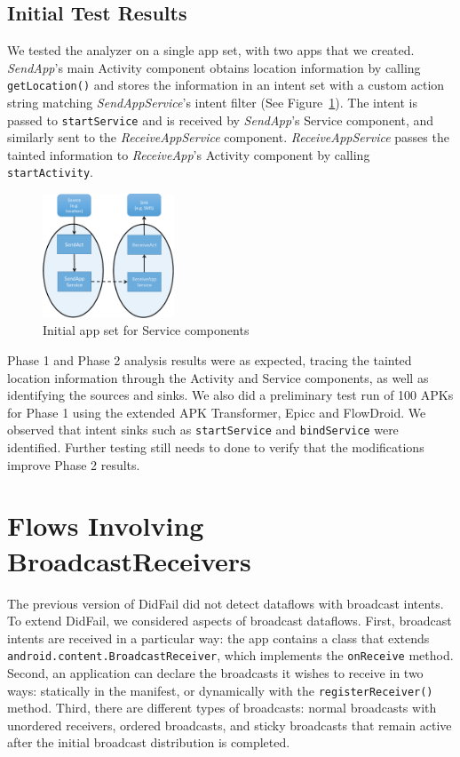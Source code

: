 \section{Initial Test Results}
We tested the analyzer on a single app set, with two apps that we created. \emph{SendApp}'s main Activity component obtains location information by calling \texttt{getLocation()} and stores the information in an intent set with a custom action string matching \emph{SendAppService}'s intent filter (See Figure~\ref{fig:servicetest1}). The intent is passed to \texttt{startService} and is received by \emph{SendApp}'s Service component, and similarly sent to the \emph{ReceiveAppService} component. \emph{ReceiveAppService} passes the tainted information to \emph{ReceiveApp}'s Activity component by calling \texttt{startActivity}.

\begin{figure}[h]
	\centering
	\includegraphics[width=0.35\textwidth]{serviceapp.pdf}
	\caption{Initial app set for Service components}
	\label{fig:servicetest1}
\end{figure}

Phase 1 and Phase 2 analysis results were as expected, tracing the tainted location information through the Activity and Service components, as well as identifying the sources and sinks. We also did a preliminary test run of 100 APKs for Phase 1 using the extended APK Transformer, Epicc and FlowDroid. We observed that intent sinks such as \texttt{startService} and \texttt{bindService} were identified. Further testing still needs to done to verify that the modifications improve Phase 2 results.

\chapter{Flows Involving BroadcastReceivers} \label{chap:broadcast_receivers}
The previous version of DidFail did not detect dataflows with broadcast intents. To extend DidFail, we considered aspects of broadcast dataflows. First, broadcast intents are received in a particular way: the app contains a class that extends \texttt{android.content.BroadcastReceiver}, which implements the \texttt{onReceive} method. Second, an application can declare the broadcasts it wishes to receive in two ways: statically in the manifest, or dynamically with the \texttt{registerReceiver()} method. Third, there are different types of broadcasts: normal broadcasts with unordered receivers, ordered broadcasts, and sticky broadcasts that remain active after the initial broadcast distribution is completed.

